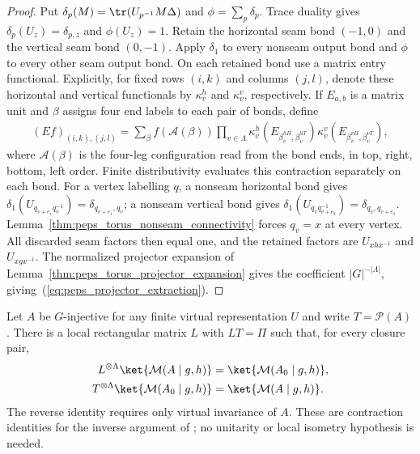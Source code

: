 \begin{proof}\leanok
    Put $\delta_p(M)=\tr(U_{p^{-1}}M\Delta)$ and
    $\phi=\sum_p\delta_p$. Trace duality gives
    $\delta_p(U_z)=\delta_{p,z}$ and $\phi(U_z)=1$.
    Retain the horizontal seam bond $(-1,0)$ and the vertical seam bond
    $(0,-1)$. Apply $\delta_1$ to every nonseam output bond and $\phi$
    to every other seam output bond. On each retained bond use a matrix
    entry functional. Explicitly, for fixed rows $(i,k)$ and columns
    $(j,l)$, denote these horizontal and vertical functionals by
    $\kappa^h_v$ and $\kappa^v_v$, respectively. If $E_{a,b}$ is a
    matrix unit and $\beta$ assigns four end labels to each pair of bonds,
    define
    \begin{align}
        (Ef)_{(i,k),(j,l)}
        =\sum_\beta f(\mathcal A(\beta))\prod_{v\in\Lambda}
        \kappa^h_v(E_{\beta_v^{hH},\beta_v^{hT}})
        \kappa^v_v(E_{\beta_v^{vH},\beta_v^{vT}}),
    \end{align}
    where $\mathcal A(\beta)$ is the four-leg configuration read from
    the bond ends, in top, right, bottom, left order. Finite distributivity
    evaluates this contraction separately on each bond.
    For a vertex labelling $q$, a nonseam horizontal bond gives
    $\delta_1(U_{q_{v+e_1}q_v^{-1}})=\delta_{q_{v+e_1},q_v}$;
    a nonseam vertical bond gives
    $\delta_1(U_{q_vq_{v+e_2}^{-1}})=\delta_{q_v,q_{v+e_2}}$.
    Lemma~\ref{thm:peps_torus_nonseam_connectivity} forces $q_v=x$
    at every vertex. All discarded seam factors then equal one, and
    the retained factors are $U_{xhx^{-1}}$ and $U_{xgx^{-1}}$.
    The normalized projector expansion of
    Lemma~\ref{thm:peps_torus_projector_expansion} gives the coefficient
    $|G|^{-|\Lambda|}$, giving~(\ref{eq:peps_projector_extraction}).
\end{proof}

\begin{lemma}%
    \label{thm:peps_regular_g_injective_closure_inverse}
    \leanok
    Let $A$ be $G$-injective for any finite virtual representation $U$
    and write $T=\mathcal P(A)$. There is a local rectangular matrix
    $L$ with $LT=\Pi$ such that, for every closure pair,
    \begin{align}
        L^{\otimes\Lambda}\ket{\mathcal M(A\mid g,h)}
         & =\ket{\mathcal M(A_0\mid g,h)},
        \label{eq:peps_projector_closure_forward} \\
        T^{\otimes\Lambda}\ket{\mathcal M(A_0\mid g,h)}
         & =\ket{\mathcal M(A\mid g,h)}.
        \label{eq:peps_projector_closure_reverse}
    \end{align}
    The reverse identity requires only virtual invariance of $A$.
    These are contraction identities for the inverse argument
    of \cite[Theorem~5.9]{Schuch2010PEPS}; no unitarity or local
    isometry hypothesis is needed.
\end{lemma}

